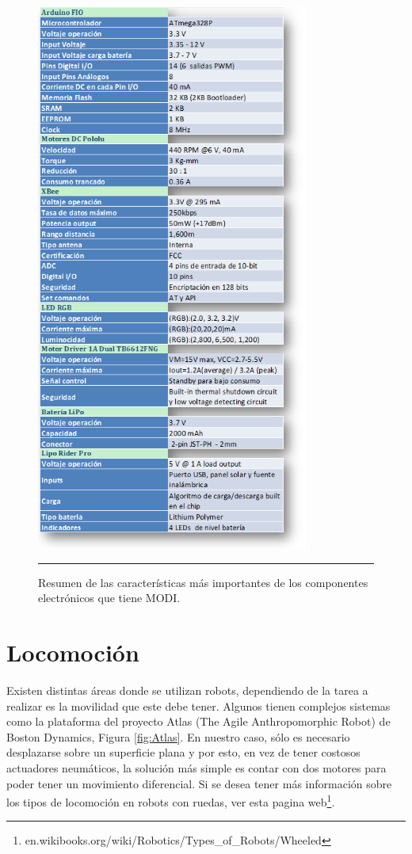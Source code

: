 \begin{figure}[htbp]
	\centering
		\includegraphics[width=0.8\textwidth]{./Figures/MODI/comparacionElo.png}
		\rule{35em}{0.5pt}
	\caption[Tabla caracteristicas más importantes de los componentes Eléctronicos]{Resumen de las características más importantes de los componentes electrónicos que tiene MODI.}
	\label{fig:TablaElo}
\end{figure}



\section{Locomoción}
Existen distintas áreas donde se utilizan robots, dependiendo de la tarea a realizar es la movilidad que este debe tener. Algunos tienen complejos sistemas como la plataforma del proyecto Atlas (The Agile Anthropomorphic Robot) de Boston Dynamics, Figura \ref{fig:Atlas}. En nuestro caso, sólo es necesario desplazarse sobre un superficie plana y por esto, en vez de tener costosos actuadores neumáticos, la solución más simple es contar con dos motores para poder tener un movimiento diferencial. Si se desea tener más información sobre los tipos de locomoción en robots con ruedas, ver esta pagina web\footnote{en.wikibooks.org/wiki/Robotics/Types\_of\_Robots/Wheeled}.


